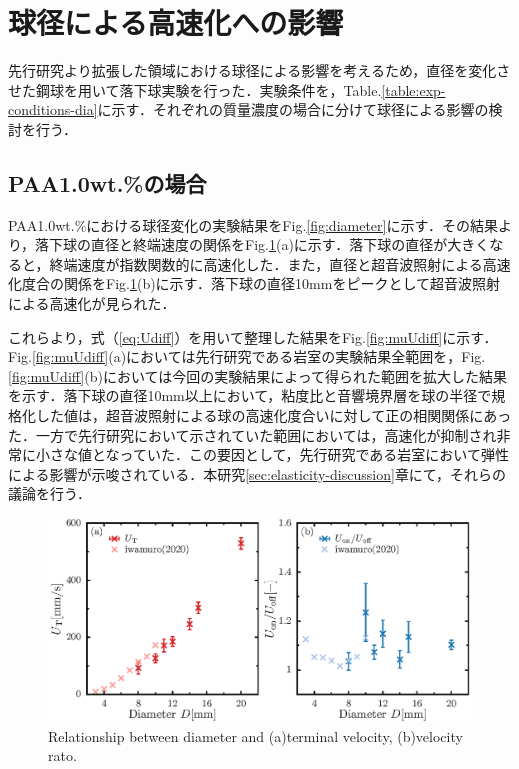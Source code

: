 \section{球径による高速化への影響}
\label{sec:diameter}
先行研究より拡張した領域における球径による影響を考えるため，直径を変化させた鋼球を用いて落下球実験を行った．実験条件を，Table.\ref{table:exp-conditions-dia}に示す．それぞれの質量濃度の場合に分けて球径による影響の検討を行う．

\subsection{PAA1.0wt.\%の場合}
PAA1.0wt.\%における球径変化の実験結果をFig.\ref{fig:diameter}に示す．その結果より，落下球の直径と終端速度の関係をFig.\ref{fig:diaUT}(a)に示す．落下球の直径が大きくなると，終端速度が指数関数的に高速化した．また，直径と超音波照射による高速化度合の関係をFig.\ref{fig:diaUT}(b)に示す．落下球の直径10mmをピークとして超音波照射による高速化が見られた．

これらより，式（\ref{eq:Udiff}）を用いて整理した結果をFig.\ref{fig:muUdiff}に示す．Fig.\ref{fig:muUdiff}(a)においては先行研究である岩室\cite{ref:8}の実験結果全範囲を，Fig.\ref{fig:muUdiff}(b)においては今回の実験結果によって得られた範囲を拡大した結果を示す．落下球の直径10mm以上において，粘度比と音響境界層を球の半径で規格化した値は，超音波照射による球の高速化度合いに対して正の相関関係にあった．一方で先行研究において示されていた範囲においては，高速化が抑制され非常に小さな値となっていた．この要因として，先行研究である岩室\cite{ref:8}において弾性による影響が示唆されている．本研究\ref{sec:elasticity-discussion}章にて，それらの議論を行う．

\begin{figure}[ht]
    \centering
    \includegraphics[width=1\textwidth]{./5-Results/diaUT_Udiff.eps}
    \caption{Relationship between diameter and (a)terminal velocity, (b)velocity rato.}
    \label{fig:diaUT}
\end{figure}

